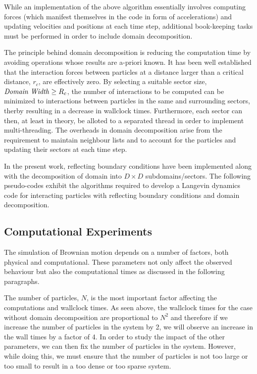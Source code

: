 \documentclass[11pt, oneside]{article}
\begin{document}
While an implementation of the above algorithm essentially involves computing forces (which manifest themselves in the code in form of accelerations) and updating velocities and positions at each time step, additional book-keeping tasks must be performed in order to include domain decomposition.

The principle behind domain decomposition is reducing the computation time by avoiding operations whose results are a-priori known. It has been well established that the interaction forces between particles at a distance larger than a critical distance, $r_c$, are effectively zero. By selecting a suitable sector size, $\text{\textit{Domain Width}} \geq R_c$, the number of interactions to be computed can be minimized to interactions between particles in the same and surrounding sectors, therby resulting in a decrease in wallclock times. Furthermore, each sector can then, at least in theory, be alloted to a separated thread in order to implement multi-threading. The overheads in domain decomposition arise from the requirement to maintain neighbour lists and to account for the particles and updating their sectors at each time step.

In the present work, reflecting boundary conditions have been implemented along with the decomposition of domain into $D \times D$ subdomains/sectors. The following pseudo-codes exhibit the algorithms required to develop a Langevin dynamics code for interacting particles with reflecting boundary conditions and domain decomposition.



\subsection{Computational Experiments}
The simulation of Brownian motion depends on a number of factors, both physical and computational. These parameters not only affect the observed behaviour but also the computational times as discussed in the following paragraphs.

The number of particles, $N$, is the most important factor affecting the computations and wallclock times. As seen above, the wallclock times for the case without domain decomposition are proportional to $N^2$ and therefore if we increase the number of particles in the system by 2, we will observe an increase in the wall times by a factor of 4. In order to study the impact of the other parameters, we can then fix the number of particles in the system. However, while doing this, we must ensure that the number of particles is not too large or too small to result in a too dense or too sparse system.
\end{document}

